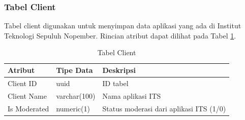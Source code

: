 \subsubsection{Tabel Client}
\par Tabel client digunakan untuk menyimpan data aplikasi yang ada di Institut Teknologi Sepuluh Nopember. Rincian atribut dapat dilihat pada Tabel \ref{tabel_client}.
\begin{longtable}{|p{2cm}|p{2.5cm}|p{4.5cm}|}
	\caption{Tabel Client} \label{tabel_client} \\ \hline
    \rowcolor{lightgray} {Atribut} & {Tipe Data} & {Deskripsi} \\ \hline
    \endhead
    Client ID & uuid & ID tabel \\ \hline
    Client Name & varchar(100) & Nama aplikasi ITS \\ \hline
    Is Moderated & numeric(1) & Status moderasi dari aplikasi ITS (1/0) \\ \hline

\end{longtable}
